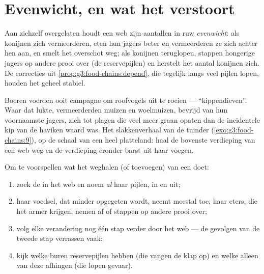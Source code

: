 \section{Evenwicht, en wat het verstoort}

\begin{proposition}\label{prop:g5:food-webs:balance}
Aan zichzelf overgelaten houdt een web zijn aantallen in ruw
\emph{evenwicht}: als konijnen
zich vermeerderen, eten hun jagers beter en vermeerderen ze zich achter
hen aan, en smelt het overschot weg; als konijnen teruglopen, stappen
hongerige jagers op andere prooi over (de reservepijlen) en herstelt het
aantal konijnen zich. De correcties uit
\cref{prop:g3:food-chains:depend}, die tegelijk langs veel pijlen lopen,
houden het geheel stabiel.
\end{proposition}
\admitted

\begin{example}\label{ex:g5:food-webs:mistake}
Boeren voerden ooit campagne om roofvogels uit te roeien ---
``kippendieven''. Waar dat lukte, vermeerderden muizen en woelmuizen,
bevrijd van hun voornaamste jagers, zich tot plagen die veel meer graan
opaten dan de incidentele kip van de haviken waard was. Het slakkenverhaal
van de tuinder (\cref{exo:g3:food-chains:9}), op de schaal van een heel
platteland: haal de bovenste verdieping van een web weg en de verdieping
eronder barst uit haar voegen.
\end{example}

\begin{method}\label{met:g5:food-webs:predict}
Om te voorspellen wat het weghalen (of toevoegen) van een  doet:
\begin{enumerate}
  \item zoek de  in het web en noem \emph{al} haar pijlen, in en
        uit;
  \item haar voedsel, dat minder opgegeten wordt, neemt meestal toe;
        haar eters, die het armer krijgen, nemen af of stappen op
        andere prooi over;
  \item volg elke verandering nog één stap verder door het web --- de
        gevolgen van de tweede stap verrassen vaak;
  \item kijk welke buren reservepijlen hebben (die vangen de klap op)
        en welke alleen van deze  afhingen (die lopen gevaar).
\end{enumerate}
\end{method}

